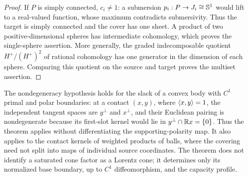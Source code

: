 \begin{proof}
If $P$ is simply connected, $c_i\ne1$: a submersion
$p_i:P\to J_i\cong\mathbb S^1$ would lift to a real-valued function, whose
maximum contradicts submersivity.
Thus the target is simply connected and the cover has one sheet.
A product of two positive-dimensional spheres has intermediate
cohomology, which proves the single-sphere assertion. More generally,
the graded indecomposable quotient $H^+/(H^+)^2$ of rational cohomology
has one generator in the dimension of each sphere. Comparing this
quotient on the source and target proves the multiset assertion.
\end{proof}

The nondegeneracy hypothesis holds for the slack of a convex body with
$C^1$ primal and polar boundaries: at a contact $(x,y)$, where
$\langle x,y\rangle=1$, the independent tangent spaces are $y^\perp$ and $x^\perp$,
and their Euclidean pairing is nondegenerate because its first-slot kernel
would lie in $y^\perp\cap\mathbb R x=\{0\}$. Thus the theorem applies without
differentiating the supporting-polarity map. It also applies to the
contact kernels of weighted products of balls, where the covering need
not split into maps of individual source coordinates. The theorem does
not identify a saturated cone factor as a Lorentz cone; it determines
only its normalized base boundary, up to $C^1$ diffeomorphism, and the
capacity profile.

